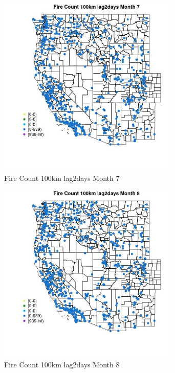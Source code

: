 \begin{figure} 
\centering  
\includegraphics[width=0.77\textwidth]{Code_Outputs/Report_ML_input_PM25_Step4_part_e_de_duplicated_aves_compiled_2019-05-21wNAs_MapObsMo7Fire_Count_100km_lag2days.jpg} 
\caption{\label{fig:Report_ML_input_PM25_Step4_part_e_de_duplicated_aves_compiled_2019-05-21wNAsMapObsMo7Fire_Count_100km_lag2days}Fire Count 100km lag2days Month 7} 
\end{figure} 
 

\clearpage 

\begin{figure} 
\centering  
\includegraphics[width=0.77\textwidth]{Code_Outputs/Report_ML_input_PM25_Step4_part_e_de_duplicated_aves_compiled_2019-05-21wNAs_MapObsMo8Fire_Count_100km_lag2days.jpg} 
\caption{\label{fig:Report_ML_input_PM25_Step4_part_e_de_duplicated_aves_compiled_2019-05-21wNAsMapObsMo8Fire_Count_100km_lag2days}Fire Count 100km lag2days Month 8} 
\end{figure} 
 

